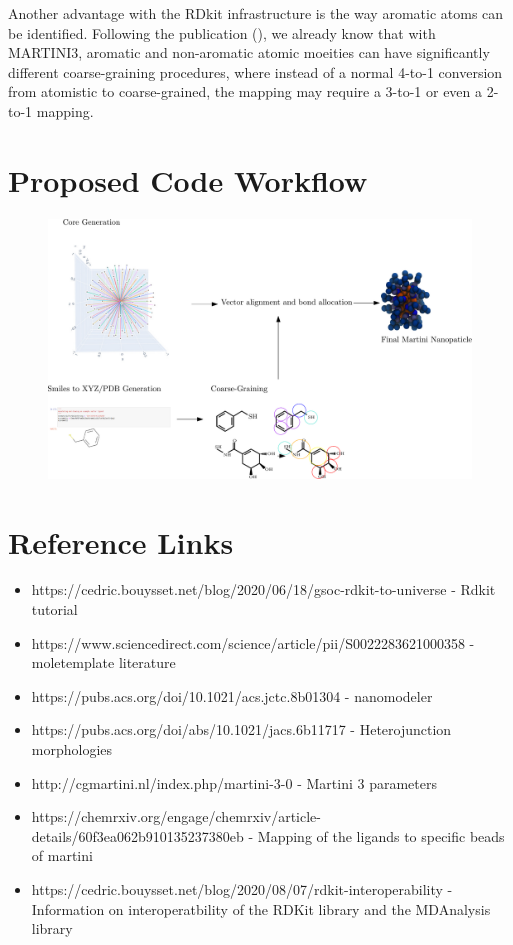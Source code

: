 \documentclass[12pt]{article}
\begin{document}
\newline
\newline
Another advantage with the RDkit infrastructure is the way aromatic atoms can be identified. Following the publication (), we already know that with MARTINI3, aromatic and non-aromatic
atomic moeities can have significantly different coarse-graining procedures, where instead of a normal 4-to-1 conversion from atomistic to coarse-grained, the mapping may require a 3-to-1 or even
a 2-to-1 mapping.

\section{Proposed Code Workflow}
\begin{figure} %
  \includegraphics[scale=0.4]{schema.pdf}
\end{figure}

\section{Reference Links}

\begin{itemize}
\item https://cedric.bouysset.net/blog/2020/06/18/gsoc-rdkit-to-universe - Rdkit tutorial

\item https://www.sciencedirect.com/science/article/pii/S0022283621000358 - moletemplate literature

\item https://pubs.acs.org/doi/10.1021/acs.jctc.8b01304 - nanomodeler

\item https://pubs.acs.org/doi/abs/10.1021/jacs.6b11717 - Heterojunction morphologies 

\item http://cgmartini.nl/index.php/martini-3-0 - Martini 3 parameters

\item https://chemrxiv.org/engage/chemrxiv/article-details/60f3ea062b910135237380eb - Mapping of the ligands to specific beads of martini

\item https://cedric.bouysset.net/blog/2020/08/07/rdkit-interoperability - Information on interoperatbility of the RDKit library and the MDAnalysis library
\end{itemize}



\end{document}
